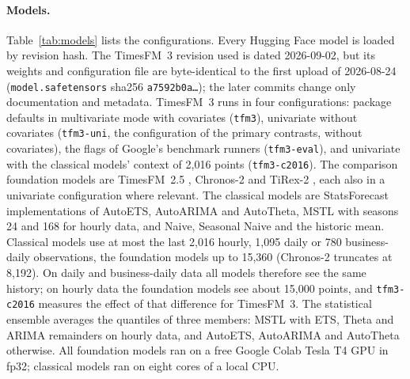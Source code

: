 \paragraph{Models.} Table~\ref{tab:models} lists the configurations. Every Hugging Face model is loaded by revision hash. The TimesFM~3 revision used is dated 2026-09-02, but its weights and configuration file are byte-identical to the first upload of 2026-08-24 (\texttt{model.safetensors} sha256 \texttt{a7592b0a\ldots}); the later commits change only documentation and metadata.
TimesFM~3 runs in four configurations: package defaults in multivariate mode with covariates (\texttt{tfm3}), univariate without
covariates (\texttt{tfm3-uni}, the configuration of the primary contrasts, without covariates), the flags of Google's benchmark runners
(\texttt{tfm3-eval}), and univariate with the classical models' context of 2{,}016 points (\texttt{tfm3-c2016}). The comparison
foundation models are TimesFM~2.5 \citep{das2024timesfm}, Chronos-2 \citep{ansari2025chronos2} and TiRex-2 \citep{podest2026tirex2}, each also
in a univariate configuration where relevant. The classical models are StatsForecast \citep{garza2022statsforecast} implementations of
AutoETS, AutoARIMA and AutoTheta, MSTL with seasons 24 and 168 \citep{bandara2025mstl} for hourly data, and Naive, Seasonal Naive and
the historic mean. Classical models use at most the last 2{,}016 hourly, 1{,}095 daily or 780 business-daily observations,
the foundation models up to 15{,}360 (Chronos-2 truncates at 8{,}192). On daily and business-daily data all models therefore see the
same history; on hourly data the foundation models see about 15{,}000 points, and \texttt{tfm3-c2016} measures the effect of that
difference for TimesFM~3. The statistical ensemble averages the quantiles of three members: MSTL with ETS, Theta and ARIMA remainders on
hourly data, and AutoETS, AutoARIMA and AutoTheta otherwise. All foundation models ran on a free Google Colab Tesla T4 GPU in fp32;
classical models ran on eight cores of a local CPU.

